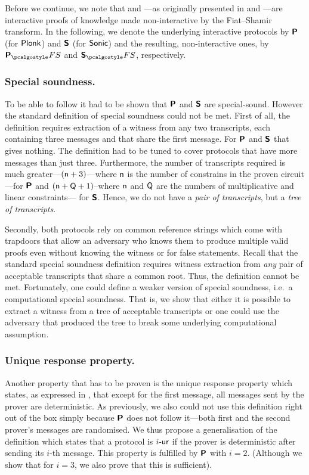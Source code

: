 \let\accentvec\vec \documentclass[runningheads,10pt]{llncs}
\begin{document}
Before we continue, we note that \plonk{} and \sonic{}---as originally
presented in \cite{EPRINT:GabWilCio19} and \cite{CCS:MBKM19}---are interactive
proofs of knowledge 
made non-interactive by the Fiat--Shamir transform.  In the following, we denote the underlying
interactive protocols by $\bm{\mathsf{P}}$ (for $\textnormal{\textsf{Plonk}}$) and $\bm{\mathsf{S}}$ (for ${\textnormal{\textsf{Sonic}}}$) and
the resulting, non-interactive ones, by $\plonkprotfs$ and $\sonicprotfs$,
respectively. 

\subsubsection{Special soundness.} 
To be able to follow \cite{INDOCRYPT:FKMV12} it had to be shown that
$\bm{\mathsf{P}}$ and $\bm{\mathsf{S}}$ are special-sound.  However the standard definition of special
soundness could not be met.  First of
all, the  definition requires extraction of a witness from any two
transcripts, each containing three messages and that share the first message. For 
$\bm{\mathsf{P}}$ and $\bm{\mathsf{S}}$ that gives nothing. The definition had to be tuned to cover
protocols that have more messages than just three.  Furthermore, the number of
transcripts required is much greater---$(\mathsf{n} + 3)$---where
$\mathsf{n}$ is the number of constrains in the proven circuit---for
$\bm{\mathsf{P}}$ and $(\mathsf{n} + \mathsf{Q} + 1)$--where $\mathsf{n}$ and
$\mathsf{Q}$ are the numbers of multiplicative and linear constraints---
for $\bm{\mathsf{S}}$. Hence, we do not have a \emph{pair of transcripts}, but a \emph{tree of transcripts}.

Secondly, both protocols rely on common reference strings which come with trapdoors
that allow an adversary who knows them to produce multiple valid proofs even without
knowing the witness or for false statements. Recall that the standard special soundness definition
requires witness extraction from \emph{any} pair of acceptable transcripts
that share a common root. Thus, the definition cannot be met. Fortunately, one
could define a weaker version of special soundness, i.e.~a computational
special soundness. That is, we show that either it is possible to
extract a witness from a tree of acceptable transcripts or one could use the
adversary that produced the tree to break some underlying computational
assumption.

\subsubsection{Unique response property.} Another property that
has to be proven is the unique response property
which states, as expressed in \cite{C:Fischlin05}, that except for the first
message, all messages sent
by the prover are deterministic. As previously, we also could not use this
definition right out of the box simply because $\bm{\mathsf{P}}$ does not follow it---both first
and the second prover's messages are randomised. We thus propose a
generalisation of the definition which states that a protocol is ${i\text{-}\mathsf{ur}}$ if the
prover is deterministic after sending its $i$-th message. This property is
fulfilled by $\bm{\mathsf{P}}$ with $i = 2$. (Although we show that for $i = 3$, we
also prove that this is sufficient).
\end{document}
